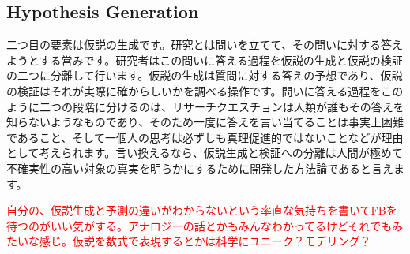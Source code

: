 


\subsection{Hypothesis Generation}
二つ目の要素は仮説の生成です。研究とは問いを立てて、その問いに対する答えようとする営みです。研究者はこの問いに答える過程を仮説の生成と仮説の検証の二つに分離して行います。仮説の生成は質問に対する答えの予想であり、仮説の検証はそれが実際に確からしいかを調べる操作です。問いに答える過程をこのように二つの段階に分けるのは、リサーチクエスチョンは人類が誰もその答えを知らないようなものであり、そのため一度に答えを言い当てることは事実上困難であること、そして一個人の思考は必ずしも真理促進的ではないことなどが理由として考えられます。言い換えるなら、仮説生成と検証への分離は人間が極めて不確実性の高い対象の真実を明らかにするために開発した方法論であると言えます。

\textcolor{red}{自分の、仮説生成と予測の違いがわからないという率直な気持ちを書いてFBを待つのがいい気がする。アナロジーの話とかもみんなわかってるけどそれでもみたいな感じ。仮説を数式で表現するとかは科学にユニーク？モデリング？}

